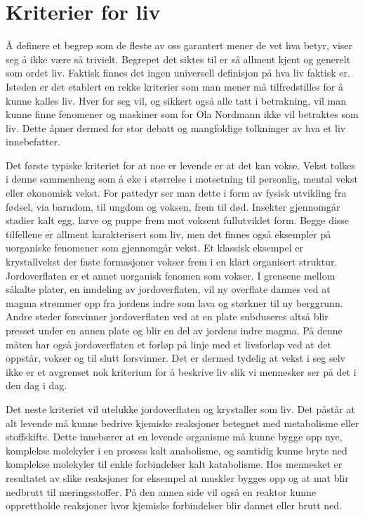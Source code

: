 \section{Kriterier for liv}

Å definere et begrep som de fleste av oss garantert mener de vet hva betyr, viser seg å ikke være så trivielt. Begrepet det siktes til er så allment kjent og generelt som ordet liv. Faktisk finnes det ingen universell definisjon på hva liv faktisk er. Isteden er det etablert en rekke kriterier som man mener må tilfredstilles for å kunne kalles liv. Hver for seg vil, og sikkert også alle tatt i betrakning, vil man kunne finne fenomener og maskiner som for Ola Nordmann ikke vil betraktes som liv. Dette åpner dermed for stor debatt og mangfoldige tolkninger av hva et liv innebefatter. 

Det første typiske kriteriet for at noe er levende er at det kan vokse. Vekst tolkes i denne sammenheng som å øke i størrelse i motsetning til personlig, mental vekst eller økonomisk vekst. For pattedyr ser man dette i form av fysisk utvikling fra fødsel, via barndom, til ungdom og voksen, frem til død. Insekter gjennomgår stadier kalt egg, larve og puppe frem mot voksent fullutviklet form. Begge disse tilfellene er allment karakterisert som liv, men det finnes også eksempler på uorganiske fenomener som gjennomgår vekst. Et klassisk eksempel er krystallvekst der faste formasjoner vokser frem i en klart organisert struktur. Jordoverflaten er et annet uorganisk fenomen som vokser. I grensene mellom såkalte plater, en inndeling av jordoverflaten, vil ny overflate dannes ved at magma strømmer opp fra jordens indre som lava og størkner til ny berggrunn. Andre steder forsvinner jordoverflaten ved at en plate subduseres altså blir presset under en annen plate og blir en del av jordens indre magma. På denne måten har også jordoverflaten et forløp på linje med et livsforløp ved at det oppstår, vokser og til slutt forsvinner. Det er dermed tydelig at vekst i seg selv ikke er et avgrenset nok kriterium for å beskrive liv slik vi mennesker ser på det i den dag i dag. 

Det neste kriteriet vil utelukke jordoverflaten og krystaller som liv. Det påstår at alt levende må kunne bedrive kjemiske reaksjoner betegnet med metabolisme eller stoffskifte. Dette innebærer at en levende organisme må kunne bygge opp nye, komplekse molekyler i en prosess kalt anabolisme, og samtidig kunne bryte ned komplekse molekyler til enkle forbindelser kalt katabolisme. Hos mennesket er resultatet av slike reaksjoner for eksempel at muskler bygges opp og at mat blir nedbrutt til næringsstoffer. På den annen side vil også en reaktor kunne opprettholde reaksjoner hvor kjemiske forbindelser blir dannet eller brutt ned.

